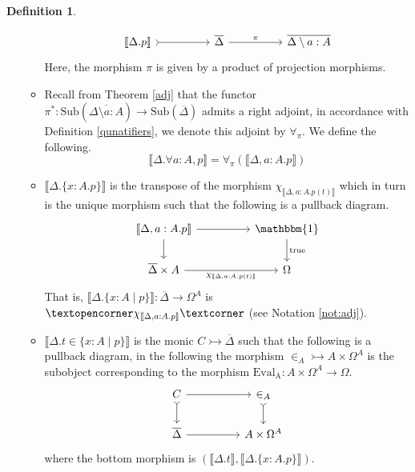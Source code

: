 \documentclass{birkjour}
\theoremstyle{plain}
\theoremstyle{definition}
\newtheorem{definition}[thm]{Definition} %
\newcommand{\adj}[1]{\text{\textopencorner}{#1}\text{\textcorner}}
\newcommand{\lto}{\longrightarrow}
\begin{document}
\begin{definition}
\begin{itemize}
\begin{itemize}
				\[
				\begin{tikzcd}[column sep = huge]
					\llbracket \Delta. p\rrbracket\arrow[r,rightarrowtail] & \overline{\Delta}\arrow[r,"{\pi}"] & \overline{\Delta\setminus a:A}
				\end{tikzcd}
				\]
				Here, the morphism $\pi$ is given by a product of projection morphisms.
				\item Recall from Theorem \ref{adj} that the functor $\pi^\ast: \text{Sub}(\overline{\Delta \setminus a:A}) \to \text{Sub}(\overline{\Delta})$ admits a right adjoint, in accordance with Definition \ref{qunatifiers}, we denote this adjoint by 
				$\forall_\pi$. We define the following.
				\begin{equation}
					\llbracket \Delta . \forall a:A, p\rrbracket = \forall_\pi(\llbracket \Delta,a:A . p \rrbracket)
				\end{equation}        
				\item $\llbracket \Delta . \lbrace x : A . p \rbrace \rrbracket$ is the transpose of the morphism $\chi_{\llbracket \Delta, a:A . p(t) \rrbracket}$ which in turn is the unique morphism such that the following is a pullback diagram.
				\[
				\begin{tikzcd}[column sep = huge]
					\llbracket \Delta, a:A . p \rrbracket\arrow[r]\arrow[d] & \mathbbm{1}\arrow[d,"{\text{true}}"]\\
					\overline{\Delta} \times A\arrow[r,swap,"{\chi_{\llbracket \Delta, a:A . p(t) \rrbracket}}"] & \Omega
				\end{tikzcd}
				\]
				That is, $\llbracket \Delta . \{ x:A \mid p \} \rrbracket: \overline{\Delta} \to \Omega^A$ is $\adj{\chi_{\llbracket \Delta, a:A . p\rrbracket}}$ (see Notation \ref{not:adj}).
				\item $\llbracket \Delta . t \in \lbrace x:A \mid p \rbrace\rrbracket$ is the monic $C \rightarrowtail \overline{\Delta}$ such that the following is a pullback diagram, in the following the morphism $\in_A \rightarrowtail A \times \Omega^A$ is the subobject corresponding to the morphism $\operatorname{Eval_A}: A \times \Omega^A \lto \Omega$.
				\[
				\begin{tikzcd}[column sep = huge]
					C\arrow[d,rightarrowtail]\arrow[r] & \in_A\arrow[d,rightarrowtail]\\
					\overline{\Delta}\arrow[r,swap] & A \times \Omega^A
				\end{tikzcd}
				\]
				where the bottom morphism is ${( \llbracket \Delta . t \rrbracket,\llbracket \Delta . \lbrace x:A . p \rbrace \rrbracket)}$.
			\end{itemize}
		\end{itemize}
	\end{definition}
\end{document}
